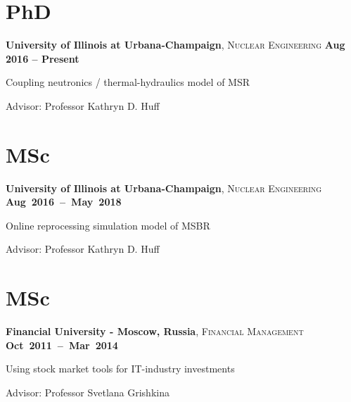 \documentclass[margin,line]{resume}
\begin{document}
\begin{resume}
    \section{\mysidestyle PhD}
    \textbf{University of Illinois at Urbana-Champaign}, \textsc{Nuclear Engineering}\hfill \textbf{ Aug 2016 -- Present}\vspace{-3mm}\\\vspace{-1mm}%
    \begin{list2}
        \item Coupling neutronics / thermal-hydraulics model of MSR
        \item Advisor:  Professor Kathryn D. Huff
    \end{list2}\vspace{-1.5mm}
    \section{\mysidestyle MSc}
    \textbf{University of Illinois at Urbana-Champaign}, \textsc{Nuclear Engineering} \hfill\textbf{\mbox{Aug 2016 -- May 2018}}\vspace{-3mm}\\\vspace{-1mm}%
    \begin{list2}
        \item Online reprocessing simulation model of MSBR
        \item Advisor:  Professor Kathryn D. Huff
    \end{list2}\vspace{-1.5mm}
    \section{\mysidestyle MSc}
    \textbf{Financial University - Moscow, Russia}, \textsc{Financial Management} \hfill \textbf{\mbox{Oct 2011 -- Mar 2014	}}\vspace{-3mm}\\\vspace{-1mm}%
    \begin{list2}
        \item Using stock market tools for IT-industry investments
        \item Advisor:  Professor Svetlana Grishkina
    \end{list2}\vspace{-1.5mm}

\end{resume}
\end{document}

